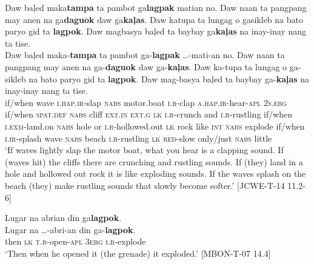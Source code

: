 \ea
Daw  baļed  maka\textbf{tampa}  ta  pambot  ga\textbf{lagpak}  matian  no.   Daw  naan  ta  pangpang  may  anen  na  ga\textbf{daguok}  daw  ga\textbf{kaļas}. Daw  katupa  ta  lungag  o  gasikleb  na  bato  paryo  gid  ta \textbf{lagpok}.  Daw  magbasya  baļed  ta  baybay  ga\textbf{kaļas}  na  inay-inay nang ta tise. \\\smallskip
\gll Daw  baļed  maka-\textbf{tampa}  ta  pambot  ga-\textbf{lagpak}   …-mati-an  no.   Daw  naan  ta  pangpang  may  anen  na  ga-\textbf{daguok}  daw  ga-\textbf{kaļas}. Daw  ka-tupa  ta  lungag  o  ga-sikleb  na  bato  paryo  gid  ta \textbf{lagpok}.  Daw  mag-basya  baļed  ta  baybay  ga-\textbf{kaļas}  na  inay-inay nang ta tise. \\
if/when  wave  \textsc{i.hap.ir}-slap  \textsc{nabs}  motor.boat  \textsc{i.r}-clap  \textsc{a.hap.ir}-hear-\textsc{apl}  2\textsc{s.erg} if/when  \textsc{spat.def}  \textsc{nabs}  cliff  \textsc{ext.in}  \textsc{ext.g}  \textsc{lk}  \textsc{i.r}-crunch  and  \textsc{i.r}-rustling if/when  \textsc{i.exm}-land.on  \textsc{nabs}  hole  or \textsc{i.r}-hollowed.out  \textsc{lk}  rock  like  \textsc{int}  \textsc{nabs} explode  if/when  \textsc{i.ir}-splash  wave  \textsc{nabs}  beach  \textsc{i.r}-rustling  \textsc{lk}  \textsc{red}-slow only/just  \textsc{nabs}  little \\
\glt `If waves lightly slap the motor boat, what you hear is a clapping sound. If (waves hit) the cliffs there are crunching and rustling sounds. If (they) land in a hole and hollowed out rock it is like exploding sounds. If the waves splash on the beach (they) make rustling sounds that slowly become softer.’ [JCWE-T-14 11.2-6]
\z

\ea
Lugar  na  abrian  din  ga\textbf{lagpok}. \\\smallskip
\gll Lugar  na   …-abri-an  din  ga-\textbf{lagpok}. \\
then  \textsc{lk}  \textsc{t.r}-open-\textsc{apl}  3\textsc{erg}  \textsc{i.r}-explode \\
\glt ‘Then when he opened it (the grenade) it exploded.’ [MBON-T-07 14.4]
\z

